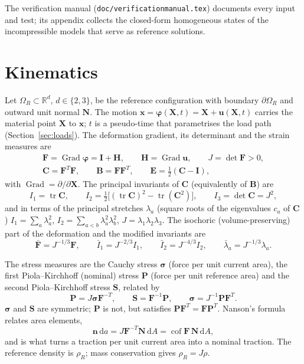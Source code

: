 \documentclass[11pt]{article}
\newcommand{\ud}{\,\mathrm{d}}
\newcommand{\Grad}{\operatorname{Grad}}
\newcommand{\tr}{\operatorname{tr}}
\newcommand{\cof}{\operatorname{cof}}
\newcommand{\bx}{\bm{x}}
\newcommand{\bX}{\bm{X}}
\newcommand{\bu}{\bm{u}}
\newcommand{\bn}{\bm{n}}
\newcommand{\bN}{\bm{N}}
\newcommand{\bsig}{\bm{\sigma}}
\newcommand{\bP}{\bm{P}}
\newcommand{\bS}{\bm{S}}
\newcommand{\bF}{\bm{F}}
\newcommand{\bFb}{\bar{\bm{F}}}
\newcommand{\bC}{\bm{C}}
\newcommand{\bB}{\bm{B}}
\newcommand{\bE}{\bm{E}}
\newcommand{\bI}{\bm{I}}
\newcommand{\bH}{\bm{H}}
\newcommand{\bphi}{\bm{\varphi}}
\newcommand{\Ione}{I_1}
\newcommand{\Itwo}{I_2}
\newcommand{\Ib}{\bar{I}_1}
\newcommand{\IIb}{\bar{I}_2}
\DeclareRobustCommand{\file}[1]{{\def\_{\textunderscore\allowbreak}\texttt{#1}}}
\begin{document}
The verification manual (\file{doc/verification\_manual.tex}) documents
every input and test; its appendix collects the closed-form homogeneous
states of the incompressible models that serve as reference solutions.

\section{Kinematics}

Let $\Omega_R \subset \mathbb{R}^d$, $d \in \{2, 3\}$, be the reference
configuration with boundary $\partial\Omega_R$ and outward unit normal
$\bN$.  The motion $\bx = \bphi(\bX, t) = \bX + \bu(\bX, t)$ carries the
material point $\bX$ to $\bx$; $t$ is a pseudo-time that parametrises the
load path (Section~\ref{sec:loads}).  The deformation gradient, its
determinant and the strain measures are
\begin{gather}
  \bF = \Grad\bphi = \bI + \bH, \qquad \bH = \Grad\bu, \qquad
  J = \det\bF > 0, \\
  \bC = \bF^T\bF, \qquad \bB = \bF\bF^T, \qquad
  \bE = \tfrac12(\bC - \bI),
\end{gather}
with $\Grad = \partial/\partial\bX$.  The principal invariants of $\bC$
(equivalently of $\bB$) are
\begin{equation}
  \Ione = \tr\bC, \qquad
  \Itwo = \tfrac12\bigl[(\tr\bC)^2 - \tr(\bC^2)\bigr], \qquad
  I_3 = \det\bC = J^2,
\end{equation}
and in terms of the principal stretches $\lambda_a$ (square roots of the
eigenvalues $c_a$ of $\bC$) $\Ione = \sum_a\lambda_a^2$,
$\Itwo = \sum_{a<b}\lambda_a^2\lambda_b^2$, $J = \lambda_1\lambda_2\lambda_3$.
The isochoric (volume-preserving) part of the deformation and the modified
invariants are
\begin{equation}
  \bFb = J^{-1/3}\bF, \qquad
  \Ib = J^{-2/3}\Ione, \qquad
  \IIb = J^{-4/3}\Itwo, \qquad
  \bar\lambda_a = J^{-1/3}\lambda_a .
  \label{eq:isochoric}
\end{equation}

The stress measures are the Cauchy stress $\bsig$ (force per unit current
area), the first Piola--Kirchhoff (nominal) stress $\bP$ (force per unit
reference area) and the second Piola--Kirchhoff stress $\bS$, related by
\begin{equation}
  \bP = J\bsig\bF^{-T}, \qquad
  \bS = \bF^{-1}\bP, \qquad
  \bsig = J^{-1}\bP\bF^T .
  \label{eq:piola}
\end{equation}
$\bsig$ and $\bS$ are symmetric; $\bP$ is not, but satisfies
$\bP\bF^T = \bF\bP^T$.  Nanson's formula relates area elements,
\begin{equation}
  \bn\ud a = J\bF^{-T}\bN\ud A = \cof\bF\,\bN\ud A,
  \label{eq:nanson}
\end{equation}
and is what turns a traction per unit current area into a nominal
traction.  The reference density is $\rho_R$; mass conservation gives
$\rho_R = J\rho$.
\end{document}
